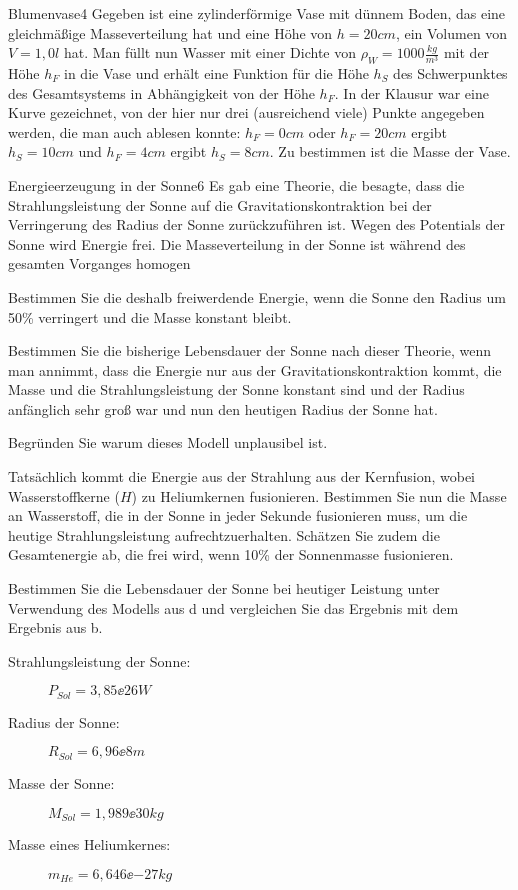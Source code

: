 


\begin{problem}{Blumenvase}{4}
Gegeben ist eine zylinderförmige Vase mit dünnem Boden, das eine gleichmäßige Masseverteilung hat und eine Höhe von $h=20\unit{cm}$, ein Volumen von $V=1,0\unit{l}$ hat. Man füllt nun Wasser mit einer Dichte von $\rho_W=1000\unit{\frac{kg}{m^3}}$ mit der Höhe $h_F$ in die Vase und erhält eine Funktion für die Höhe $h_S$ des Schwerpunktes des Gesamtsystems in Abhängigkeit von der Höhe $h_F$. In der Klausur war eine Kurve gezeichnet, von der hier nur drei (ausreichend viele) Punkte angegeben werden, die man auch ablesen konnte: $h_F=0\unit{cm}$ oder $h_F=20\unit{cm}$ ergibt $h_S=10\unit{cm}$ und $h_F=4\unit{cm}$ ergibt $h_S=8\unit{cm}$. Zu bestimmen ist die Masse der Vase.
\end{problem}

\begin{problem}{Energieerzeugung in der Sonne}{6}
Es gab eine Theorie, die besagte, dass die Strahlungsleistung der Sonne auf die Gravitationskontraktion bei der Verringerung des Radius der Sonne zurückzuführen ist. Wegen des Potentials der Sonne wird Energie frei. Die Masseverteilung in der Sonne ist während des gesamten Vorganges homogen
\begin{abcenum}
   \item Bestimmen Sie die deshalb freiwerdende Energie, wenn die Sonne den Radius um 50\% verringert und die Masse konstant bleibt.
  \item Bestimmen Sie die bisherige Lebensdauer der Sonne nach dieser Theorie, wenn man annimmt, dass die Energie nur aus der Gravitationskontraktion kommt, die Masse und die Strahlungsleistung der Sonne konstant sind und der Radius anfänglich sehr groß war und nun den heutigen Radius der Sonne hat.
  \item Begründen Sie warum dieses Modell unplausibel ist.
  \item Tatsächlich kommt die Energie aus der Strahlung aus der Kernfusion, wobei Wasserstoffkerne ($H$) zu Heliumkernen fusionieren. Bestimmen Sie nun die Masse an Wasserstoff, die in der Sonne in jeder Sekunde fusionieren muss, um die heutige Strahlungsleistung aufrechtzuerhalten. Schätzen Sie zudem die Gesamtenergie ab, die frei wird, wenn 10\% der Sonnenmasse fusionieren.
  \item Bestimmen Sie die Lebensdauer der Sonne bei heutiger Leistung unter Verwendung des Modells aus d und vergleichen Sie das Ergebnis mit dem Ergebnis aus b.
\end{abcenum}
\begin{description}
  \item[Strahlungsleistung der Sonne:] $P_{Sol}=3,85\ee{26}\unit{W}$
  \item[Radius der Sonne:] $R_{Sol}=6,96\ee{8}\unit{m}$
  \item[Masse der Sonne:] $M_{Sol}=1,989\ee{30}\unit{kg}$
  \item[Masse eines Heliumkernes:] $m_{He}=6,646\ee{-27}\unit{kg}$
\end{description}
\end{problem}

